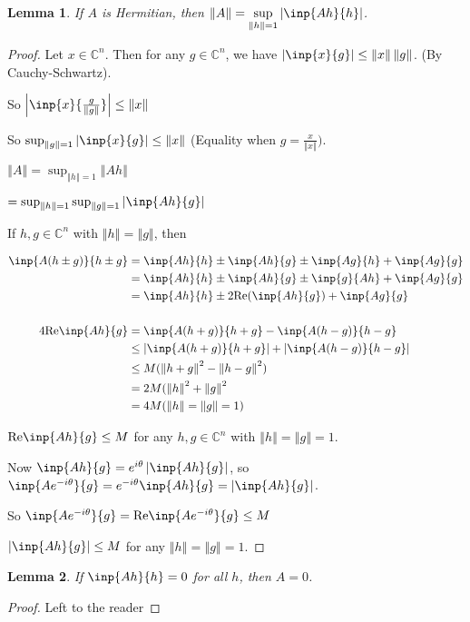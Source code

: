 \documentclass[twofold]{article}
\newcommand*\norm[1]{\left \Vert #1 \right\Vert}
\newcommand*\abs[1]{\left \vert #1 \right\vert}
\theoremstyle{plain}
\newtheorem*{lemma}{Lemma}
\theoremstyle{definition}
\theoremstyle{remark}
\begin{document}
\begin{lemma} If \(A\) is Hermitian, then \(\norm{A} =\displaystyle \sup_{\norm{h} = 1} \abs{\inp{Ah}{h}}\).\end{lemma}
\begin{proof} Let \(x \in \mathbb{C}^n\). Then for any \(g \in \mathbb{C}^n\), we have \(\abs{\inp{x}{g}} \le \norm{x} \norm{g}\). (By Cauchy-Schwartz).

So \(\abs{\inp{x}{\frac{g}{\norm{g}}}} \le \norm{x}\) 

So \(\sup_{\norm{g} = 1} \abs{\inp{x}{g}} \le \norm{x} \) (Equality when \(g = \frac{x}{\norm{x}})\).

\(\norm{A} = \sup_{\norm{h} = 1} \norm{Ah}\)

\(= \sup_{\norm{h} = 1} \sup_{\norm{g}=1} \abs{\inp{Ah}{g}}  \)

If \(h, g \in \mathbb{C}^n\) with \(\norm{h} = \norm{g}\), then

\begin{equation*} \begin{split}
\inp{A (h \pm g)}{h\pm g} & = \inp{Ah}{h} \pm \inp{Ah}{g} \pm \inp{Ag}{h} + \inp{Ag}{g} \\
& = \inp{Ah}{h} \pm \inp{Ah}{g} \pm \inp{g}{Ah} + \inp{Ag}{g} \\
& = \inp{Ah}{h} \pm 2 \text{Re}(\inp{Ah}{g}) + \inp{Ag}{g} \\ \\
4 \text{Re}\inp{Ah}{g} &= \inp{A(h+g)}{h+g} - \inp{A(h-g)}{h-g} \\
& \le \abs{\inp{A(h+g)}{h+g}} + \abs{\inp{A(h-g)}{h-g}} \\
& \le M (\norm{h + g}^2 - \norm{h-g}^2) \\
& = 2M (\norm{h}^2 + \norm{g}^2 \\
& = 4M (\norm{h} = \norm{g} = 1) 
\end{split} \end{equation*}

\(\text{Re} \inp{Ah}{g} \le M\) for any \(h, g \in \mathbb{C}^n\) with \(\norm{h} = \norm{g} = 1\). 

Now \(\inp{Ah}{g} = e^{i \theta} \abs{\inp{Ah}{g}}\), so \(\inp{A e^{- i\theta}}{g} = e^{-i \theta} \inp{Ah}{g} = \abs{\inp{Ah}{g}}\).

So \(\inp{Ae^{-i\theta}}{g} =  \text{Re} \inp{Ae^{-i\theta}}{g} \le M\)

\(\abs{\inp{Ah}{g}} \le M\) for any \(\norm{h} = \norm{g} = 1\).
\end{proof}


\begin{lemma} If \(\inp{Ah}{h} = 0\) for all \(h\), then \(A = 0\).\end{lemma}
\begin{proof} Left to the reader \end{proof}
\end{document}
